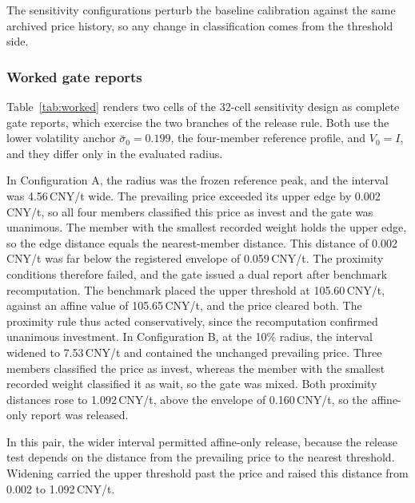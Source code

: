 \documentclass[5p,times,authoryear]{elsarticle}
\theoremstyle{plain}
\newcommand{\sbar}{\bar{\sigma}_0}
\begin{document}
The sensitivity configurations perturb the baseline calibration against the same archived price history, so any change in classification comes from the threshold side.

\subsubsection{Worked gate reports}

Table~\ref{tab:worked} renders two cells of the 32-cell sensitivity design as complete gate reports, which exercise the two branches of the release rule. Both use the lower volatility anchor $\sbar=0.199$, the four-member reference profile, and $V_0=I$, and they differ only in the evaluated radius.

In Configuration A, the radius was the frozen reference peak, and the interval was 4.56\,CNY/t wide. The prevailing price exceeded its upper edge by 0.002\,CNY/t, so all four members classified this price as invest and the gate was unanimous. The member with the smallest recorded weight holds the upper edge, so the edge distance equals the nearest-member distance. This distance of 0.002\,CNY/t was far below the registered envelope of 0.059\,CNY/t. The proximity conditions therefore failed, and the gate issued a dual report after benchmark recomputation. The benchmark placed the upper threshold at 105.60\,CNY/t, against an affine value of 105.65\,CNY/t, and the price cleared both. The proximity rule thus acted conservatively, since the recomputation confirmed unanimous investment. In Configuration B, at the 10\% radius, the interval widened to 7.53\,CNY/t and contained the unchanged prevailing price. Three members classified the price as invest, whereas the member with the smallest recorded weight classified it as wait, so the gate was mixed. Both proximity distances rose to 1.092\,CNY/t, above the envelope of 0.160\,CNY/t, so the affine-only report was released.

In this pair, the wider interval permitted affine-only release, because the release test depends on the distance from the prevailing price to the nearest threshold. Widening carried the upper threshold past the price and raised this distance from 0.002 to 1.092\,CNY/t.
\end{document}

